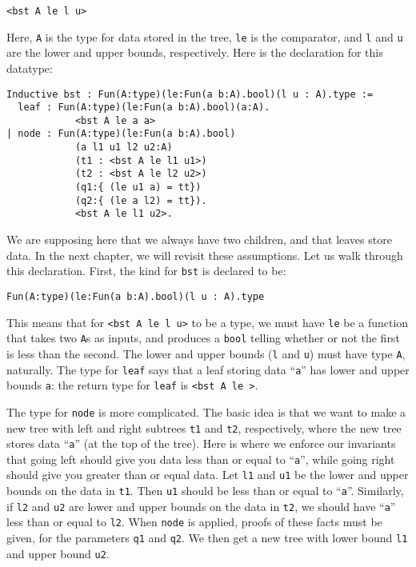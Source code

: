\documentclass{book}[12pt]
\begin{document}
\begin{verbatim}
<bst A le l u>
\end{verbatim}

\noindent Here, \texttt{A} is the type for data stored in the tree,
\texttt{le} is the comparator, and \texttt{l} and \texttt{u} are
the lower and upper bounds, respectively.  Here is the declaration
for this datatype:

\begin{verbatim}
Inductive bst : Fun(A:type)(le:Fun(a b:A).bool)(l u : A).type :=
  leaf : Fun(A:type)(le:Fun(a b:A).bool)(a:A).
            <bst A le a a>
| node : Fun(A:type)(le:Fun(a b:A).bool)
            (a l1 u1 l2 u2:A)
            (t1 : <bst A le l1 u1>)
            (t2 : <bst A le l2 u2>)
            (q1:{ (le u1 a) = tt})
            (q2:{ (le a l2) = tt}).
            <bst A le l1 u2>.
\end{verbatim}

\noindent We are supposing here that we always have two children, and
that leaves store data.  In the next chapter, we will revisit these
assumptions.  Let us walk through this declaration.  First, the kind
for \texttt{bst} is declared to be:

\begin{verbatim}
Fun(A:type)(le:Fun(a b:A).bool)(l u : A).type
\end{verbatim}

\noindent This means that for \texttt{<bst A le l u>} to be a type, we
must have \texttt{le} be a function that takes two \texttt{A}s as
inputs, and produces a \texttt{bool} telling whether or not the first
is less than the second.  The lower and upper bounds (\texttt{l} and
\texttt{u}) must have type \texttt{A}, naturally.  The type for
\texttt{leaf} says that a leaf storing data ``\texttt{a}'' has lower
and upper bounds \texttt{a}: the return type for \texttt{leaf} is
\texttt{<bst A le  >}.  

The type for \texttt{node} is more complicated.  The basic idea is
that we want to make a new tree with left and right subtrees
\texttt{t1} and \texttt{t2}, respectively, where the new tree stores
data ``\texttt{a}'' (at the top of the tree).  Here is where we
enforce our invariants that going left should give you data less than
or equal to ``\texttt{a}'', while going right should give you greater
than or equal data.  Let \texttt{l1} and \texttt{u1} be the lower and
upper bounds on the data in \texttt{t1}.  Then \texttt{u1} should be
less than or equal to ``\texttt{a}''.  Similarly, if \texttt{l2} and
\texttt{u2} are lower and upper bounds on the data in \texttt{t2}, we
should have ``\texttt{a}'' less than or equal to \texttt{l2}.  When
\texttt{node} is applied, proofs of these facts must be given, for the
parameters \texttt{q1} and \texttt{q2}.  We then get a new tree with
lower bound \texttt{l1} and upper bound \texttt{u2}.
\end{document}
